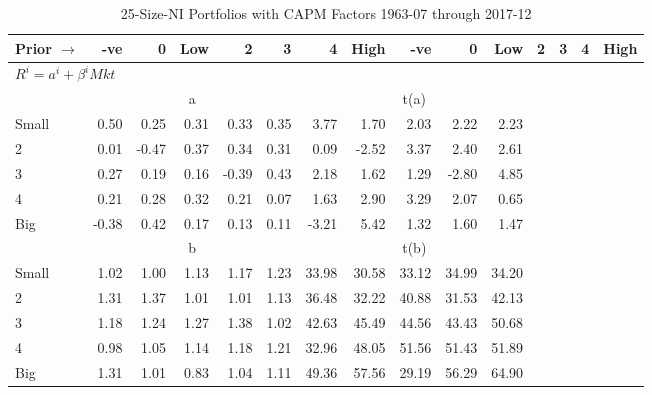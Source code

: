 
\begin{table}[!ht]
\footnotesize
\centering
\caption{25-Size-NI Portfolios with CAPM Factors 1963-07 through 2017-12}
\begin{tabular}{lrrrrrrrrrrrrrr}
  \toprule
    Prior $\rightarrow$ & -ve & 0 & Low & 2 & 3 & 4 & High & -ve & 0 & Low & 2 & 3 & 4 & High \\ 
  \midrule
  \multicolumn{11}{l}{$R^i=a^i+\beta^iMkt$} \\

  
    
      & \multicolumn{5}{c}{a} & \multicolumn{5}{c}{t(a)}
    
    \\
      \cmidrule(r){2-6} \cmidrule(r){7-11}

    Small   & 0.50  & 0.25  & 0.31  & 0.33  & 0.35  & 3.77  & 1.70  & 2.03  & 2.22  & 2.23  \\
         2  & 0.01  & -0.47  & 0.37  & 0.34  & 0.31  & 0.09  & -2.52  & 3.37  & 2.40  & 2.61  \\
         3  & 0.27  & 0.19  & 0.16  & -0.39  & 0.43  & 2.18  & 1.62  & 1.29  & -2.80  & 4.85  \\
         4  & 0.21  & 0.28  & 0.32  & 0.21  & 0.07  & 1.63  & 2.90  & 3.29  & 2.07  & 0.65  \\
    Big     & -0.38  & 0.42  & 0.17  & 0.13  & 0.11  & -3.21  & 5.42  & 1.32  & 1.60  & 1.47  \\

  
    
      & \multicolumn{5}{c}{b} & \multicolumn{5}{c}{t(b)}
    
    \\
      \cmidrule(r){2-6} \cmidrule(r){7-11}

    Small   & 1.02  & 1.00  & 1.13  & 1.17  & 1.23  & 33.98  & 30.58  & 33.12  & 34.99  & 34.20  \\
         2  & 1.31  & 1.37  & 1.01  & 1.01  & 1.13  & 36.48  & 32.22  & 40.88  & 31.53  & 42.13  \\
         3  & 1.18  & 1.24  & 1.27  & 1.38  & 1.02  & 42.63  & 45.49  & 44.56  & 43.43  & 50.68  \\
         4  & 0.98  & 1.05  & 1.14  & 1.18  & 1.21  & 32.96  & 48.05  & 51.56  & 51.43  & 51.89  \\
    Big     & 1.31  & 1.01  & 0.83  & 1.04  & 1.11  & 49.36  & 57.56  & 29.19  & 56.29  & 64.90  \\

  

  \bottomrule
\end{tabular}
\label{tbl:25_Size_NI_CAPM}
\end{table}